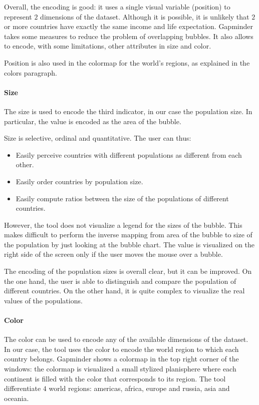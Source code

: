 Overall, the encoding is good:
it uses a single visual variable (position) to represent $2$ dimensions of the dataset.
Although it is possible, it is unlikely that $2$ or more countries have exactly the same income and life expectation.
Gapminder takes some measures to reduce the problem of overlapping bubbles.
It also allows to encode, with some limitations, other attributes in size and color.

Position is also used in the colormap for the world's regions, as explained in the colors paragraph.

\paragraph{Size}
The size is used to encode the third indicator, in our case the population size.
In particular, the value is encoded as the area of the bubble.

Size is selective, ordinal and quantitative.
The user can thus:
\begin{itemize}
    \item Easily perceive countries with different populations as different from each other.
    \item Easily order countries by population size.
    \item Easily compute ratios between the size of the populations of different countries.
\end{itemize}

However, the tool does not visualize a legend for the sizes of the bubble.
This makes difficult to perform the inverse mapping from area of the bubble to size of the population by just looking at the bubble chart.
The value is visualized on the right side of the screen only if the user moves the mouse over a bubble.

The encoding of the population sizes is overall clear, but it can be improved.
On the one hand, the user is able to distinguish and compare the population of different countries.
On the other hand, it is quite complex to visualize the real values of the populations.

\paragraph{Color}
\label{paragraph:bubbles-color}
The color can be used to encode any of the available dimensions of the dataset.
In our case, the tool uses the color to encode the world region to which each country belongs.
Gapminder shows a colormap in the top right corner of the windows:
the colormap is visualized a small stylized planisphere where each continent is filled with the color that corresponds to its region.
The tool differentiate $4$ world regions: americas, africa, europe and russia, asia and oceania.

